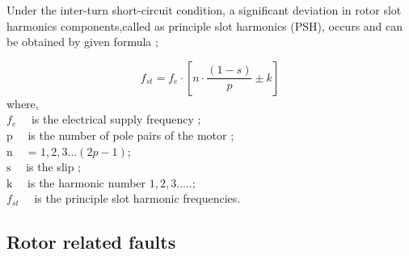 Under the inter-turn short-circuit condition, a significant deviation in rotor slot harmonics components,called as principle slot harmonics (PSH), occurs and can be obtained by given formula \cite{Penman};

\begin{equation}
	f_{st}=f_{e} \cdot\left[n \cdot \frac{(1-s)}{p} \pm k\right]
	\label{statorfault}
\end{equation}
where,\\
$f_{e} \quad$ is the electrical supply frequency ;\\
$\mathrm{p} \quad$ is the number of pole pairs of the motor ;\\
$\mathrm{n} \quad$ = $1,2,3 \ldots (2p-1)$;\\
$\mathrm{s} \quad$ is the slip ;\\
$\mathrm{k} \quad$ is the harmonic number $1,2,3 \ldots$..;\\
$f_{st} \quad$ is the principle slot harmonic frequencies.

\subsection{Rotor related faults}






	
